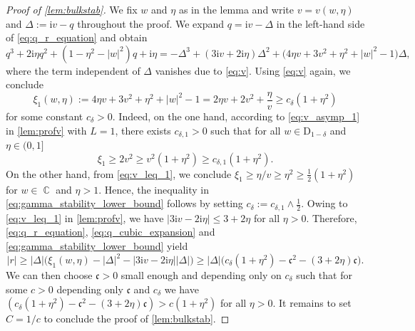 \documentclass[11pt]{article}
\DeclareMathOperator{\CC}{\mathbb{C}}
\newcommand{\ii}{\mathrm{i}}
\newcommand{\abs}[1]{\left| #1 \right|}
\theoremstyle{plain}
\theoremstyle{remark}
\numberwithin{equation}{section}
\begin{document}
	\begin{proof}[Proof of \cref{lem:bulkstab}]
		We fix $w$ and $\eta$ as in the lemma and write $v=v(w, \eta)$ and $\Delta :=\ii v - q$ throughout the proof. We expand $q = \ii v - \Delta$ in the left-hand side of \eqref{eq:q_r_equation} and obtain
		\begin{equation}\label{eq:q_cubic_expansion} 
			q^3 + 2\ii\eta q^2 + \left(1-\eta^2 - |w|^2 \right) q +\ii \eta = -\Delta^3 + ( 3 \ii v + 2\ii \eta) \Delta^2 + \bigl( 4 \eta v + 3 v^{2} + \eta^2 + \left|w\right|^2 -1 \bigr) \Delta, 
		\end{equation}
		where the term independent of $\Delta$ vanishes due to \eqref{eq:v}. 
		Using \eqref{eq:v} again, we conclude 
		\begin{equation}\label{eq:gamma_stability_lower_bound} 
			\xi_1(w,\eta):= 4 \eta v + 3 v^{2} + \eta^2 + \left|w\right|^2 -1= 2\eta v + 2v^2 + \frac{\eta}{v} \ge c_{\delta}( 1 + \eta^2)
		\end{equation}
		for some constant $c_{\delta}>0$. Indeed, on the one hand, according to \eqref{eq:v_asymp_1} in \cref{lem:profv} with $L=1$, there exists $c_{\delta,1}>0$ such that for all $w \in \mathrm{D}_{1-\delta}$ and $\eta \in (0,1]$
		\begin{equation}
			\xi_1 \ge 2 v^2 \ge v^2 (1+ \eta^2) \ge c_{\delta,1} (1+ \eta^2).
		\end{equation}
		On the other hand, from \eqref{eq:v_leq_1}, we conclude $\xi_1 \ge {\eta}/{v} \ge \eta^2 \ge \frac{1}{2} (1 + \eta^2)$ for $w \in \CC$ and $\eta >1$. Hence, the inequality in \eqref{eq:gamma_stability_lower_bound} follows by setting
		$c_{\delta}:=c_{\delta,1} \land \frac{1}{2}$.
		Owing to \eqref{eq:v_leq_1} in \cref{lem:profv}, we have $\abs{3\ii v - 2 \ii \eta} \leq 3 + 2\eta$ for all $\eta>0$.  
		Therefore, \eqref{eq:q_r_equation}, \eqref{eq:q_cubic_expansion} and \eqref{eq:gamma_stability_lower_bound} yield 
		\begin{equation}
			|r| \ge \left| \Delta \right| \bigl( \xi_1(w,\eta) - \left|\Delta\right|^2 - |3 \ii v -2 \ii \eta| \left|\Delta\right| \bigr) \ge  \left| \Delta \right| \bigl( c_{\delta}(1 + \eta^2) - \mathfrak{c}^2 - (3 + 2 \eta)\mathfrak{c} \bigr).
		\end{equation}
		We can then choose $\mathfrak{c}>0$ small enough and depending only on $c_{\delta}$ such that for some $c>0$ depending only $\mathfrak{c}$ and $c_{\delta}$ we have $\left( c_{\delta}(1 + \eta^2) - \mathfrak{c}^2 - (3 + 2 \eta)\mathfrak{c} \right) > c(1+ \eta^2)$ for all $\eta >0$. It remains to set $C= 1/c$ to conclude the proof of \cref{lem:bulkstab}.
	\end{proof}
	
\end{document}
